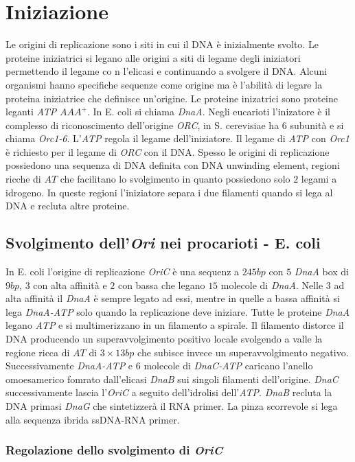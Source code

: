\section{Iniziazione}
Le origini di replicazione sono i siti in cui il DNA \`e inizialmente svolto. Le proteine iniziatrici si legano alle origini a siti di legame degli iniziatori permettendo il legame co n
l'elicasi e continuando a svolgere il DNA. Alcuni organismi hanno specifiche sequenze come origine ma \`e l'abilit\`a di legare la proteina iniziatrice che definisce un'origine. Le
proteine inizatrici sono proteine leganti \emph{ATP} \emph{$AAA^+$}. In E. coli si chiama \emph{DnaA}. Negli eucarioti l'inizatore \`e il complesso di riconoscimento dell'origine 
\emph{ORC}, in S. cerevisiae ha $6$ subunit\`a e si chiama \emph{Orc1-6}. L'\emph{ATP} regola il legame dell'iniziatore. Il legame di \emph{ATP} con \emph{Orc1} \`e richiesto per 
il legame di \emph{ORC} con il DNA. Spesso le origini di replicazione possiedono una sequenza di DNA definita con DNA unwinding element, regioni ricche di $AT$ che facilitano lo 
svolgimento in quanto possiedono solo $2$ legami a idrogeno. In queste regioni l'iniziatore separa i due filamenti quando si lega al DNA e recluta altre proteine. 	
\subsection{Svolgimento dell'\emph{Ori} nei procarioti - E. coli}
In E. coli l'origine di replicazione \emph{OriC} \`e una sequenz a $245bp$ con $5$ \emph{DnaA} box di $9bp$, $3$ con alta affinit\`a e $2$ con bassa che legano $15$ molecole di 
\emph{DnaA}. Nelle $3$ ad alta affinit\`a il \emph{DnaA} \`e sempre legato ad essi, mentre in quelle a bassa affinit\`a si lega \emph{DnaA-ATP} solo quando la replicazione deve iniziare. 
Tutte le proteine \emph{DnaA} legano \emph{ATP} e si multimerizzano in un filamento a spirale. Il filamento distorce il DNA producendo un superavvolgimento positivo locale svolgendo 
a valle la regione ricca di $AT$ di $3\times 13bp$ che subisce invece un superavvolgimento negativo. Successivamente \emph{DnaA-ATP} e $6$ molecole di \emph{DnaC-ATP} caricano 
l'anello omoesamerico fomrato dall'elicasi \emph{DnaB} sui singoli filamenti dell'origine. \emph{DnaC} successivamente lascia l'\emph{OriC} a seguito dell'idrolisi dell'\emph{ATP}. 
\emph{DnaB} recluta la DNA primasi \emph{DnaG} che sintetizzer\`a il RNA primer. La pinza scorrevole si lega alla sequenza ibrida ssDNA-RNA primer. 
\subsubsection{Regolazione dello svolgimento di \emph{OriC}}

